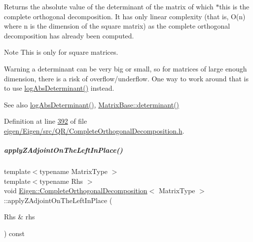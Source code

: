\begin{DoxyReturn}{Returns}
the absolute value of the determinant of the matrix of which $\ast$this is the complete orthogonal decomposition. It has only linear complexity (that is, O(n) where n is the dimension of the square matrix) as the complete orthogonal decomposition has already been computed.
\end{DoxyReturn}
\begin{DoxyNote}{Note}
This is only for square matrices.
\end{DoxyNote}
\begin{DoxyWarning}{Warning}
a determinant can be very big or small, so for matrices of large enough dimension, there is a risk of overflow/underflow. One way to work around that is to use \hyperlink{group___q_r___module_ad59d6dc78dab52a0038ac372b4a72c0d}{log\+Abs\+Determinant()} instead.
\end{DoxyWarning}
\begin{DoxySeeAlso}{See also}
\hyperlink{group___q_r___module_ad59d6dc78dab52a0038ac372b4a72c0d}{log\+Abs\+Determinant()}, \hyperlink{group___core___module_a7ad8f77004bb956b603bb43fd2e3c061}{Matrix\+Base\+::determinant()} 
\end{DoxySeeAlso}


Definition at line \hyperlink{eigen_2_eigen_2src_2_q_r_2_complete_orthogonal_decomposition_8h_source_l00392}{392} of file \hyperlink{eigen_2_eigen_2src_2_q_r_2_complete_orthogonal_decomposition_8h_source}{eigen/\+Eigen/src/\+Q\+R/\+Complete\+Orthogonal\+Decomposition.\+h}.

\mbox{\label{group___q_r___module_a0a89641e0b4ea92c515405f2a31e6abe}} 
\subparagraph{\texorpdfstring{apply\+Z\+Adjoint\+On\+The\+Left\+In\+Place()}{applyZAdjointOnTheLeftInPlace()}\hspace{0.1cm}{\footnotesize\ttfamily [1/2]}}
{\footnotesize\ttfamily template$<$typename Matrix\+Type $>$ \\
template$<$typename Rhs $>$ \\
void \hyperlink{group___q_r___module_class_eigen_1_1_complete_orthogonal_decomposition}{Eigen\+::\+Complete\+Orthogonal\+Decomposition}$<$ Matrix\+Type $>$\+::apply\+Z\+Adjoint\+On\+The\+Left\+In\+Place (\begin{DoxyParamCaption}\item[{Rhs \&}]{rhs }\end{DoxyParamCaption}) const\hspace{0.3cm}{\ttfamily [protected]}}

